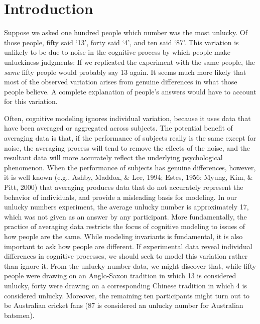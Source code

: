 \documentclass[authoryear]{elsarticle}
\begin{document}
\section{Introduction}

Suppose we asked one hundred people which number was the most unlucky.
Of those people, fifty said `13', forty said `4', and ten said `87'. This
variation is unlikely to be due to noise in the cognitive process by which
people make unluckiness judgments:  If we replicated the experiment
with the same people, the \emph{same} fifty people would probably
say 13 again. It seems much more likely that most of the observed variation
arises from genuine differences in what those people believe. A complete
explanation of people's answers would have to account for this variation.

Often, cognitive modeling ignores individual variation, because it uses data
that have been averaged  or aggregated across subjects. The potential benefit of
averaging data is that, if the performance of subjects really is the same
except for noise, the averaging process will tend to remove the effects
of the noise, and the resultant data will more accurately reflect the
underlying psychological phenomenon. When the performance of
subjects has genuine differences, however, it is well known
(e.g., Ashby, Maddox, \& Lee, 1994; Estes, 1956; Myung, Kim, \& Pitt, 2000) that
averaging produces data that do not accurately represent the behavior of
individuals, and provide a misleading basis for modeling. In our unlucky
numbers experiment, the average unlucky number is
approximately 17, which was not given as an answer by any participant.
More fundamentally, the practice of averaging
data restricts the focus of cognitive modeling to issues of how people are
the same. While modeling invariants is fundamental, it is also important
to ask how people are different. If experimental data reveal individual
differences in cognitive processes, we should seek to model this variation
rather than ignore it. From the unlucky number data, we might discover that, while fifty people
were drawing on an Anglo-Saxon tradition in which 13 is considered
unlucky, forty were drawing on a corresponding Chinese tradition in which
4 is considered unlucky. Moreover, the remaining ten participants might
turn out to be Australian cricket fans (87 is considered an unlucky number
for Australian batsmen).
\end{document}
